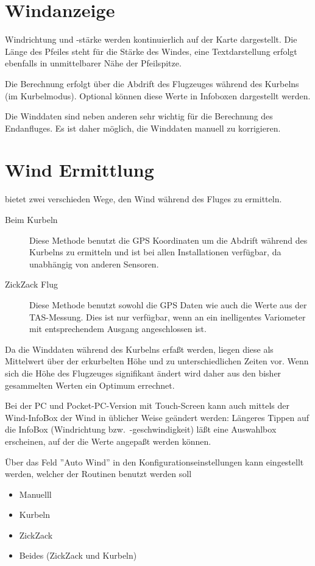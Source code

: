 \section{Windanzeige}
Windrichtung und -stärke werden kontinuierlich auf der Karte dargestellt.
Die Länge des Pfeiles steht für die Stärke des Windes, eine Textdarstellung erfolgt
ebenfalls in unmittelbarer Nähe der Pfeilspitze.

Die Berechnung erfolgt über die Abdrift des Flugzeuges während des Kurbelns (im Kurbelmodus).
Optional können diese Werte in Infoboxen dargestellt werden.

Die Winddaten sind neben anderen sehr wichtig für die Berechnung des Endanfluges.
Es ist daher möglich, die Winddaten manuell zu korrigieren.
\section{Wind Ermittlung}\label{sec:wind-estimation}
\xc bietet zwei verschieden Wege, den Wind während des Fluges zu ermitteln.
\begin{description}
\item[Beim Kurbeln]  Diese Methode benutzt die  GPS Koordinaten um die Abdrift während
des Kurbelns zu ermitteln und ist bei allen \xc Installationen verfügbar, da unabhängig von anderen Sensoren.
\item[ZickZack Flug] Diese Methode benutzt sowohl die GPS Daten wie auch die Werte aus der TAS-Messung.
Dies ist nur verfügbar, wenn \xc an ein inelligentes Variometer mit entsprechendem Ausgang angeschlossen ist.
\end{description}

Da die Winddaten während des Kurbelns erfaßt werden, liegen diese als Mittelwert über der erkurbelten Höhe und
zu unterschiedlichen Zeiten vor. Wenn sich die Höhe des Flugzeuges signifikant ändert wird daher aus den
bisher gesammelten Werten ein Optimum errechnet.

Bei der PC und Pocket-PC-Version mit Touch-Screen kann auch mittels der Wind-InfoBox der Wind in
üblicher Weise geändert werden:
Längeres Tippen auf die InfoBox (Windrichtung bzw.\ -geschwindigkeit) läßt eine Auswahlbox
erscheinen, auf der die Werte angepaßt  werden können.

Über das Feld ''Auto Wind'' in den Konfigurationseinstellungen  kann
eingestellt werden, welcher der Routinen benutzt werden soll

\begin{itemize}
\item Manuelll
\item Kurbeln
\item ZickZack
\item Beides (ZickZack und Kurbeln)
\end{itemize}

